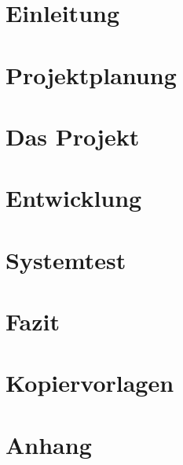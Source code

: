 \documentclass[11pt,a4paper,titlepage,openright,multicol]{scrbook}
\begin{document}
\frontmatter

\mainmatter



\tableofcontents

\part{Einleitung}
\label{part:Einleitung}
%
%
%

\part{Projektplanung}
\label{part:Projektplanung}
%
%
%
%

\part{Das Projekt}
\label{part:Das Projekt}

\part{Entwicklung}
\label{part:Entwicklung}
%

\part{Systemtest}
\label{part:Systemtest}
%

\part{Fazit}
\label{part:Fazit}
%

\part{Kopiervorlagen}
\label{part:Kopiervorlagen}

\backmatter
\appendix
\part{Anhang}
\label{part:Anhang}



\printglossary

\listoffigures

\listoftables

\lstlistoflistings

\printindex

\end{document}
